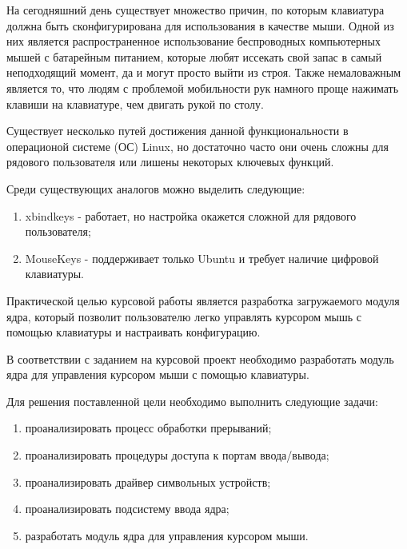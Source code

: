 \newpage
{}
На сегодняшний день существует множество причин, по которым клавиатура должна быть сконфигурирована для использования в качестве мыши.
Одной из них является распространенное использование беспроводных компьютерных мышей с батарейным питанием, которые любят иссекать свой запас в самый неподходящий момент, да и могут просто выйти из строя.
Также немаловажным является то, что людям с проблемой мобильности рук намного проще нажимать клавиши на клавиатуре, чем двигать рукой по столу.

Существует несколько путей достижения данной функциональности в операционой системе (ОС) Linux, но достаточно часто они очень сложны для рядового пользователя или лишены некоторых ключевых функций.

Среди существующих аналогов можно выделить следующие:
\begin{enumerate}
	\item xbindkeys - работает, но настройка окажется сложной для рядового пользователя;
	\item MouseKeys - поддерживает только Ubuntu и требует наличие цифровой клавиатуры.
\end{enumerate}

Практической целью курсовой работы является разработка загружаемого модуля ядра, который позволит пользователю легко управлять курсором мышь с помощью клавиатуры и настраивать конфигурацию.

В соответствии с заданием на курсовой проект необходимо разработать модуль ядра для управления курсором мыши с помощью клавиатуры.

Для решения поставленной цели необходимо выполнить следующие задачи:
\begin{enumerate}
	\item проанализировать процесс обработки прерываний;
	\item проанализировать процедуры доступа к портам ввода/вывода;
	\item проанализировать драйвер символьных устройств;
	\item проанализировать подсистему ввода ядра;
	\item разработать модуль ядра для управления курсором мыши.
\end{enumerate}

